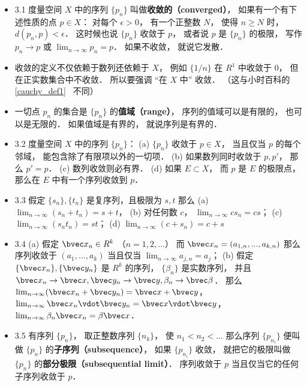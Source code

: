 \begin{itemize}
\item 3.1 度量空间 $X$ 中的序列 $\{p_n\}$ 叫做\textbf{收敛的（converged）}， 如果有一个有下述性质的点 $p\in X$： 对每个 $\epsilon > 0$， 有一个正整数 $N$， 使得 $n \geqslant N$ 时， $d(p_n,p) < \epsilon$． 这时候也说 $\{p_n\}$ 收敛于 $p$， 或者说 $p$ 是 $\{p_n\}$ 的极限， 写作 $p_n\to p$ 或 $\lim_{n\to \infty} p_n = p$． 如果不收敛， 就说它发散．

\item 收敛的定义不仅依赖于数列还依赖于 $X$， 例如 $\{1/n\}$ 在 $R^1$ 中收敛于 $0$， 但在正实数集合中不收敛． 所以要强调 “在 $X$ 中” 收敛． （这与小时百科的\autoref{cauchy_def1}~ 不同）

\item 一切点 $p_n$ 的集合是 $\{p_n\}$ 的\textbf{值域（range）}， 序列的值域可以是有限的， 也可以是无限的． 如果值域是有界的， 就说序列是有界的．

\item 3.2 度量空间 $X$ 中的序列 $\{p_n\}$： (a) $\{p_n\}$ 收敛于 $p\in X$， 当且仅当 $p$ 的每个邻域， 能包含除了有限项以外的一切项． (b) 如果数列同时收敛于 $p, p'$， 那么 $p' = p$． (c) 数列收敛则必有界． (d) 如果 $E \subset X$， 而 $p$ 是 $E$ 的极限点， 那么在 $E$ 中有一个序列收敛到 $p$．

\item 3.3 假定 $\{s_n\}, \{t_n\}$ 是复序列，且极限为 $s, t$ 那么 (a) $\lim_{n\to\infty} (s_n+t_n) = s+t$， (b) 对任何数 $c$， $\lim_{n\to\infty}cs_n = cs$； (c) $\lim_{n\to\infty}(s_n t_n) = st$； (d) $\lim_{n\to\infty} (c+s_n) = c+s$

\item 3.4 (a) 假定 $\bvec x_n \in R^k$ （$n=1,2,...$） 而 $\bvec x_n = (a_{1,n}, ...,a_{k,n})$ 那么序列收敛于 $(a_1,...,a_k)$ 当且仅当 $\lim_{n\to\infty} a_{j,n} = a_j$； (b) 假定 $\{\bvec x_n\}, \{\bvec y_n\}$ 是 $R^k$ 的序列， $\{\beta_n\}$ 是实数序列， 并且 $\bvec x_n\to \bvec x, \bvec y_n\to \bvec y, \beta_n\to\bvec \beta$． 那么 $\lim_{n\to\infty} (\bvec x_n+\bvec y_n) = \bvec x+\bvec y$， $\lim_{n\to\infty} \bvec x_n \vdot \bvec y_n = \bvec x \vdot \bvec y$， $\lim_{n\to\infty} \beta_n \bvec x_n = \beta \bvec x$．

\item 3.5 有序列 $\{p_n\}$， 取正整数序列 $\{n_k\}$， 使 $n_1<n_2<...$ 那么序列 $\{p_{n_i}\}$ 便叫做 $\{p_n\}$ 的\textbf{子序列（subsequence）}， 如果 $\{p_{n_i}\}$ 收敛， 就把它的极限叫做 $\{p_n\}$ 的\textbf{部分极限（subsequential limit）}． 序列收敛于 $p$ 当且仅当它的任何子序列收敛于 $p$．


\end{itemize}
